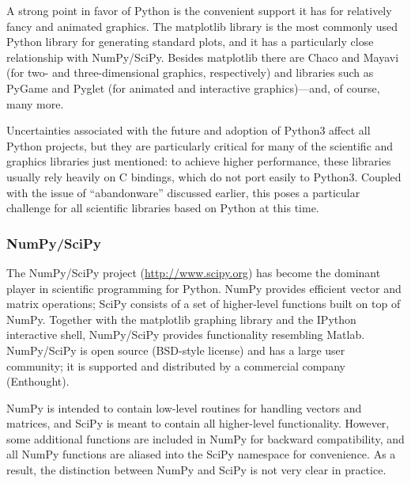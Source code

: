 A strong point in favor of Python is the convenient support it has for
relatively fancy and animated graphics. The matplotlib library is the
most commonly used Python library for generating standard plots, and
it has a particularly close relationship with NumPy/SciPy.  Besides
matplotlib there are Chaco and Mayavi (for two- and three-dimensional
graphics, respectively) and libraries such as PyGame and Pyglet (for
animated and interactive graphics)---and, of course, many more.

Uncertainties associated with the future and adoption of Python3
affect all Python projects, but they are particularly critical for
many of the scientific and graphics libraries just mentioned: to
achieve higher performance, these libraries usually rely heavily on C
bindings, which do not port easily to Python3. Coupled with the issue
of ``abandonware'' discussed earlier, this poses a particular
challenge for all scientific libraries based on Python at this time.


\vspace*{-9pt}
\subsubsection{NumPy/SciPy}


The NumPy/SciPy project (\url{http://www.scipy.org}) has become the dominant player in scientific
programming for Python. NumPy provides efficient vector and matrix
operations; SciPy consists of a set of higher-level functions built on
top of NumPy. Together with the matplotlib graphing library and the
IPython interactive shell, NumPy/SciPy provides functionality
resembling Matlab. NumPy/SciPy is open source (BSD-style license) and
has a large user community; it is supported and distributed by a
commercial company (Enthought).

NumPy is intended to contain low-level routines for handling vectors
and matrices, and SciPy is meant to contain all higher-level
functionality.  However, some additional functions are included in
NumPy for backward compatibility, and all NumPy functions are aliased
into the SciPy namespace for convenience. As a result, the
distinction between NumPy and SciPy is not very clear in practice.


